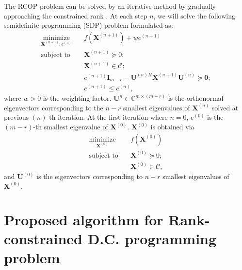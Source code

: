 \documentclass[10pt,journal,twocolumn,twoside]{IEEEtran}
\begin{document}
The RCOP problem can be solved by an iterative method by gradually approaching the constrained rank \cite{sun2017rank}. At each step $n$, we will solve the following semidefinite programming (SDP) problem formulated as:
\begin{align} \label{rank}
\underset{\bm{X}^{(n+1)}, e^{(n)}}{\text{minimize}}  & \quad f(\bm{X}^{(n+1)})  + w e^{(n+1)} \\
\text{subject to}& \quad \bm{X}^{(n+1)} \succeq 0;\nonumber\\
& \quad \bm{X}^{(n+1)}\in \mathcal{C}; \nonumber\\
&\quad e^{(n+1)}\bm{I}_{m-r} - \bm{U}^{(n)H} \bm{X}^{(n+1)} \bm{U}^{(n)} \succeq \bm{0};\nonumber\\
&\quad e^{(n+1)} \leq e^{(n)},\nonumber
\end{align}
where $w > 0$ is the weighting factor. $\bm{U}^{n} \in \mathbb{C}^{{m}\times (m-r)}$ is the orthonormal eigenvectors corresponding to the $n-r$ smallest eigenvalues of $\bm{X}^{(n)}$ solved at previous $(n) $-th iteration. At the first iteration where $n=0$, $e^{(0)}$ is the $(m-r)$-th smallest eigenvalue of $\bm{X}^{(0)}$. $\bm{X}^{(0)}$ is obtained via
\begin{align} \label{x0}
\underset{{\bm{X}^{(0)}}}{\text{minimize}} & \quad f(\bm{X}^{(0)}) \\
\text{subject to}& \quad \bm{X}^{(0)} \succeq 0;\nonumber\\
& \quad \bm{X}^{(0)}\in \mathcal{C}, \nonumber
\end{align}
and $\bm{U}^{(0)}$ is the eigenvectors corresponding to $n-r$ smallest eigenvalues of $\bm{X}^{(0)}$.

\section{Proposed algorithm for Rank-constrained D.C. programming problem}
\end{document}
